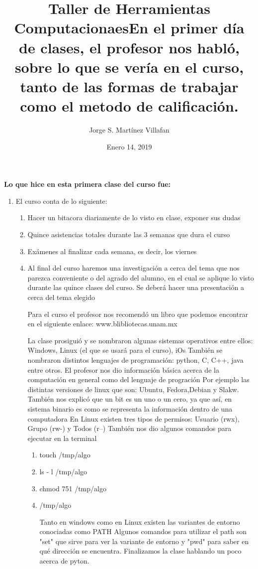 \documentclass[letterpaper, 12pt, oneside]{article}%
\title{\Huge Taller de Herramientas Computacionaes}
\author{Jorge S. Martínez Villafan}
\date{Enero 14, 2019}
\begin{document}
\maketitle
\newpage
\title{En el primer día de clases, el profesor nos habló, sobre lo que se vería en el curso, tanto de las formas de trabajar como el metodo de calificación.}

\textbf{Lo que hice en esta primera clase del curso fue:}
\begin{enumerate}
	\item  El curso conta de lo siguiente:
	\begin{enumerate}
		\item Hacer un bitacora diariamente de lo visto en clase, exponer sus dudas
		\item Quince asistencias totales durante las 3 semanas que dura el curso
		\item Exámenes al finalizar cada semana, es decir, los viernes
		\item Al final del curso haremos una investigación a cerca del tema que nos parezca conveniente o del agrado del alumno, en el cual se aplique lo visto durante las quince clases del curso. Se deberá hacer una presentación a cerca del tema elegido
		
Para el curso el profesor nos recomendó un libro que podemos encontrar en el siguiente enlace: www.blibliotecas.unam.mx 

La clase prosiguió y se nombraron algunas sistemas operativos entre ellos: Windows, Linux (el que se usará para el curso), iOs
También se nombraron distintos lenguajes de programación: python, C, C++, java entre otros.
El profesor nos dio información básica acerca de la computación en general como del lenguaje de progración
Por ejemplo las distintas versiones de linux que son: Ubuntu, Fedora,Debian y Slakw.
También nos explicó que un bit es un uno o un cero, ya que así, en sistema binario es como se representa la información dentro de una computadora
 En Linux existen tres tipos de permisos: Usuario (rwx), Grupo (rw-) y Todos (r--)
 También nos dio algunos comandos para ejecutar en la terminal
 \begin{enumerate}
 	\item touch /tmp/algo
 	\item ls - l /tmp/algo
 	\item chmod 751 /tmp/algo
 	\item /tmp/algo
 	
Tanto en windows como en Linux existen las variantes de entorno conociadas como PATH
Algunos comandos para utilizar el path son "set" que sirve para ver la variante de entorno y "pwd" para saber en qué dirección se encuentra. 
Finalizamos la clase hablando un poco acerca de pyton.
 \end{enumerate}
		\end{enumerate}
\end{enumerate}	
			
\end{document}
